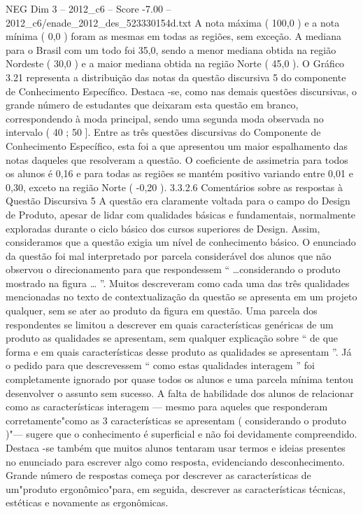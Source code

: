 \begin{textsample}{NEG Dim 3 – 2012\_c6 – Score -7.00 – 2012\_c6/enade\_2012\_des\_523330154d.txt}
A nota máxima ( 100,0 ) e a nota mínima ( 0,0 ) foram as mesmas em todas as regiões, sem exceção.
A mediana para o Brasil com um todo foi 35,0, sendo a menor mediana obtida na região Nordeste ( 30,0 ) e a maior mediana obtida na região Norte ( 45,0 ).
O Gráfico 3.21 representa a distribuição das notas da questão discursiva 5 do componente de Conhecimento Específico.
Destaca -se, como nas demais questões discursivas, o grande número de estudantes que deixaram esta questão em branco, correspondendo à moda principal, sendo uma segunda moda observada no intervalo ( 40 ; 50 ].
Entre as três questões discursivas do Componente de Conhecimento Específico, esta foi a que apresentou um maior espalhamento das notas daqueles que resolveram a questão.
O coeficiente de assimetria para todos os alunos é 0,16 e para todas as regiões se mantém positivo variando entre 0,01 e 0,30, exceto na região Norte ( -0,20 ). 3.3.2.6 Comentários sobre as respostas à Questão Discursiva 5 A questão era claramente voltada para o campo do Design de Produto, apesar de lidar com qualidades básicas e fundamentais, normalmente exploradas durante o ciclo básico dos cursos superiores de Design.
Assim, consideramos que a questão exigia um nível de conhecimento básico.
O enunciado da questão foi mal interpretado por parcela considerável dos alunos que não observou o direcionamento para que respondessem “ …considerando o produto mostrado na figura … ”.
Muitos descreveram como cada uma das três qualidades mencionadas no texto de contextualização da questão se apresenta em um projeto qualquer, sem se ater ao produto da figura em questão.
Uma parcela dos respondentes se limitou a descrever em quais características genéricas de um produto as qualidades se apresentam, sem qualquer explicação sobre “ de que forma e em quais características desse produto as qualidades se apresentam ”.
Já o pedido para que descrevessem “ como estas qualidades interagem ” foi completamente ignorado por quase todos os alunos e uma parcela mínima tentou desenvolver o assunto sem sucesso.
A falta de habilidade dos alunos de relacionar como as características interagem — mesmo para aqueles que responderam corretamente"como as 3 características se apresentam ( considerando o produto )"— sugere que o conhecimento é superficial e não foi devidamente compreendido.
Destaca -se também que muitos alunos tentaram usar termos e ideias presentes no enunciado para escrever algo como resposta, evidenciando desconhecimento.
Grande número de respostas começa por descrever as características de um"produto ergonômico"para, em seguida, descrever as características técnicas, estéticas e novamente as ergonômicas.

\end{textsample}
